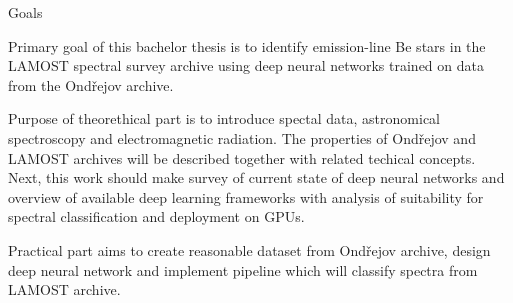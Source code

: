 \chap Goals

Primary goal of this bachelor thesis is to identify emission-line
Be stars in the LAMOST spectral survey archive
using deep neural networks trained on data from the Ondřejov archive.

Purpose of theorethical part is to introduce spectal data,
astronomical spectroscopy and electromagnetic radiation.
The properties of Ondřejov and LAMOST archives will be
described together with related techical concepts.
Next, this work should make survey of current state of deep neural networks
and overview of available deep learning
frameworks with analysis of suitability for spectral classification
and deployment on GPUs.

Practical part aims to create reasonable dataset from Ondřejov archive,
design deep neural network
and implement pipeline which will classify spectra from LAMOST archive.
